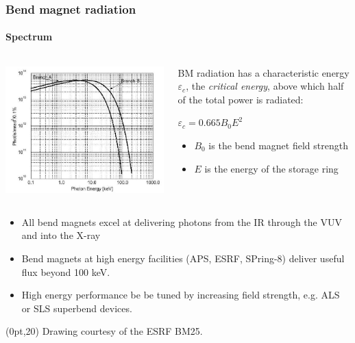 \documentclass[10pt, xcolor=x11names, compress]{beamer}
\begin{document}
\begin{frame}
  \frametitle{Bend magnet radiation}
  \framesubtitle{Spectrum}
  \begin{columns}
    \begin{column}{0.5\linewidth}
      \includegraphics[width=\linewidth]{synch/bm.jpeg}
    \end{column}
    \begin{column}{0.5\linewidth}
      BM radiation has a characteristic energy $\varepsilon_c$, the
      \textit{critical energy}, above which half of the total power is
      radiated:
      \begin{center}
        \alert{$\varepsilon_c = 0.665 B_0 E^2$}
      \end{center}
      \begin{itemize}
      \item $B_0$ is the bend magnet field strength
      \item $E$ is the energy of the storage ring
      \end{itemize}
    \end{column}
  \end{columns}

  \smallskip

  \begin{itemize}
  \item All bend magnets excel at delivering photons from the IR through
    the VUV and into the X-ray
  \item Bend magnets at high energy facilities (APS, ESRF, SPring-8)
    deliver useful flux beyond 100 keV.
  \item High energy performance be be tuned by increasing field
    strength, e.g. ALS or SLS \alert{superbend} devices.
  \end{itemize}


  \begin{textblock*}{0.5\linewidth}(0pt,20\TPVertModule)%
    \tiny%
    Drawing courtesy of the ESRF BM25.
  \end{textblock*}
\end{frame}
\end{document}
